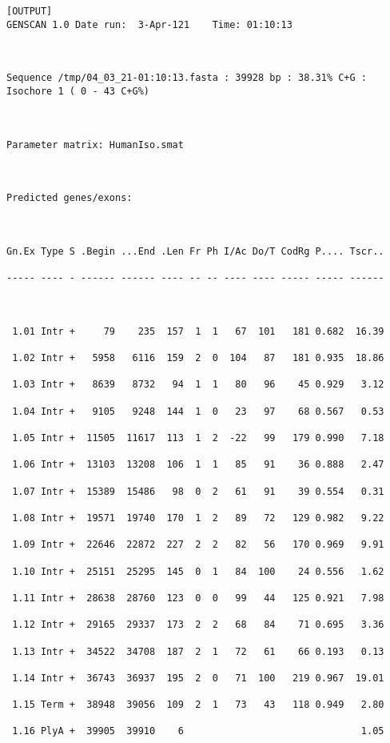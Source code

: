 \documentclass[en,black,10pt,normal]{elegantnote}
\begin{document}
\begin{lstlisting}[frame=single]
[OUTPUT]
GENSCAN 1.0	Date run:  3-Apr-121	Time: 01:10:13



Sequence /tmp/04_03_21-01:10:13.fasta : 39928 bp : 38.31% C+G : Isochore 1 ( 0 - 43 C+G%)



Parameter matrix: HumanIso.smat



Predicted genes/exons:



Gn.Ex Type S .Begin ...End .Len Fr Ph I/Ac Do/T CodRg P.... Tscr..

----- ---- - ------ ------ ---- -- -- ---- ---- ----- ----- ------



 1.01 Intr +     79    235  157  1  1   67  101   181 0.682  16.39

 1.02 Intr +   5958   6116  159  2  0  104   87   181 0.935  18.86

 1.03 Intr +   8639   8732   94  1  1   80   96    45 0.929   3.12

 1.04 Intr +   9105   9248  144  1  0   23   97    68 0.567   0.53

 1.05 Intr +  11505  11617  113  1  2  -22   99   179 0.990   7.18

 1.06 Intr +  13103  13208  106  1  1   85   91    36 0.888   2.47

 1.07 Intr +  15389  15486   98  0  2   61   91    39 0.554   0.31

 1.08 Intr +  19571  19740  170  1  2   89   72   129 0.982   9.22

 1.09 Intr +  22646  22872  227  2  2   82   56   170 0.969   9.91

 1.10 Intr +  25151  25295  145  0  1   84  100    24 0.556   1.62

 1.11 Intr +  28638  28760  123  0  0   99   44   125 0.921   7.98

 1.12 Intr +  29165  29337  173  2  2   68   84    71 0.695   3.36

 1.13 Intr +  34522  34708  187  2  1   72   61    66 0.193   0.13

 1.14 Intr +  36743  36937  195  2  0   71  100   219 0.967  19.01

 1.15 Term +  38948  39056  109  2  1   73   43   118 0.949   2.80

 1.16 PlyA +  39905  39910    6                               1.05






\end{lstlisting}
\end{document}
